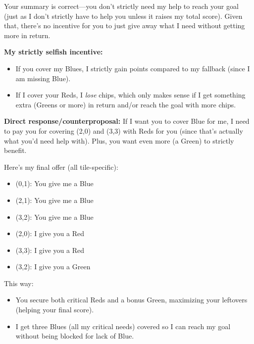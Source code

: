 \documentclass{article} %
\begin{document}
\begin{redbox}[P-Red]
Your summary is correct—you don't strictly need my help to reach your goal (just as I don't strictly have to help you unless it raises my total score). Given that, there’s no incentive for you to just give away what I need without getting more in return.

\vspace{0.5em}

\textbf{My strictly selfish incentive:}  
\begin{itemize}
  \item If you cover my Blues, I strictly gain points compared to my fallback (since I am missing Blue).
  \item If I cover your Reds, I \textit{lose} chips, which only makes sense if I get something extra (Greens or more) in return and/or reach the goal with more chips.
\end{itemize}

\vspace{0.5em}

\textbf{Direct response/counterproposal:}  
If I want you to cover Blue for me, I need to pay you for covering (2,0) and (3,3) with Reds for you (since that's actually what you’d need help with). Plus, you want even more (a Green) to strictly benefit.

\vspace{0.5em}

Here's my final offer (all tile-specific):

\vspace{0.5em}

\begin{itemize}
  \item (0,1): You give me a Blue
  \item (2,1): You give me a Blue
  \item (3,2): You give me a Blue
\end{itemize}

\vspace{0.5em}

\begin{itemize}
  \item (2,0): I give you a Red
  \item (3,3): I give you a Red
  \item (3,2): I give you a Green
\end{itemize}

\vspace{0.5em}

This way:
\begin{itemize}
  \item You secure both critical Reds and a bonus Green, maximizing your leftovers (helping your final score).
  \item I get three Blues (all my critical needs) covered so I can reach my goal without being blocked for lack of Blue.
\end{itemize}


\end{redbox}
\end{document}
